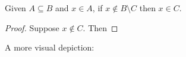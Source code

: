 
\begin{theorem}
  Given $A \subseteq B$ and $x \in A$, if $x \notin B\setminus C$ then $x
  \in C$. 
\end{theorem}

\begin{proof}
  Suppose $x \notin C$. Then
\end{proof}

A more visual depiction:

\begin{align*}
\end{align*}

